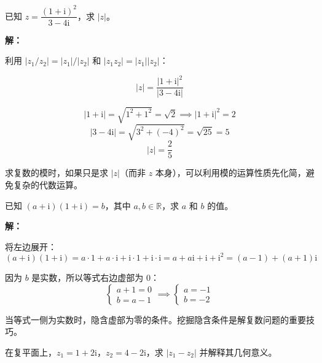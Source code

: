 \documentclass[12pt, a4paper]{ctexart}
\begin{document}
\vspace{6pt}

\begin{examplebox}[【例题6】利用模的性质化简]
已知 $z = \dfrac{(1+\mathrm{i})^2}{3-4\mathrm{i}}$，求 $|z|$。
\end{examplebox}

\textbf{解：}

利用 $|z_1/z_2| = |z_1|/|z_2|$ 和 $|z_1 z_2| = |z_1||z_2|$：

\[
|z| = \frac{|1+\mathrm{i}|^2}{|3-4\mathrm{i}|}
\]

\[
|1+\mathrm{i}| = \sqrt{1^2+1^2} = \sqrt{2} \implies |1+\mathrm{i}|^2 = 2
\]
\[
|3-4\mathrm{i}| = \sqrt{3^2+(-4)^2} = \sqrt{25} = 5
\]
\[
|z| = \frac{2}{5}
\]

\begin{tipbox}[方法总结]
求复数的模时，如果只是求 $|z|$（而非 $z$ 本身），可以利用模的运算性质先化简，避免复杂的代数运算。
\end{tipbox}

\vspace{6pt}

\begin{examplebox}
已知 $(a + \mathrm{i})(1 + \mathrm{i}) = b$，其中 $a, b \in \mathbb{R}$，求 $a$ 和 $b$ 的值。
\end{examplebox}

\textbf{解：}

将左边展开：
\[
  (a + \mathrm{i})(1 + \mathrm{i}) = a \cdot 1 + a \cdot \mathrm{i} + \mathrm{i} \cdot 1 + \mathrm{i} \cdot \mathrm{i}
  = a + a\mathrm{i} + \mathrm{i} + \mathrm{i}^2
  = (a - 1) + (a + 1)\mathrm{i}
\]

因为 $b$ 是实数，所以等式右边虚部为 $0$：
\[
  \begin{cases}
    a + 1 = 0 \\[4pt]
    b = a - 1
  \end{cases}
  \implies
  \begin{cases}
    a = -1 \\[4pt]
    b = -2
  \end{cases}
\]

\begin{tipbox}[方法总结]
当等式一侧为实数时，隐含虚部为零的条件。挖掘隐含条件是解复数问题的重要技巧。
\end{tipbox}

\vspace{6pt}

\begin{examplebox}
在复平面上，$z_1 = 1 + 2\mathrm{i}$，$z_2 = 4 - 2\mathrm{i}$，求 $|z_1 - z_2|$ 并解释其几何意义。
\end{examplebox}
\end{document}
